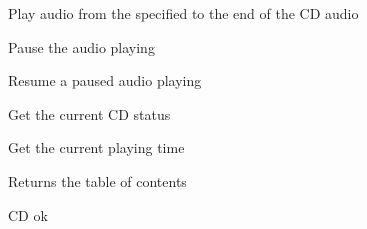 
Play audio from the specified to the end of the CD audio


\label{wxcdaudioplay}



\label{wxcdaudiopause}


Pause the audio playing


\label{wxcdaudioresume}


Resume a paused audio playing


\label{wxcdaudiogetstatus}


Get the current CD status


\label{wxcdaudiogettime}


Get the current playing time


\label{wxcdaudiogettoc}


Returns the table of contents


\label{wxcdaudiook}


CD ok

